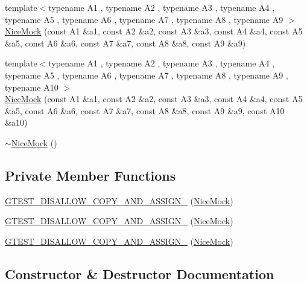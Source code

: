 \begin{DoxyCompactItemize}
\item 
{\footnotesize template$<$typename A1 , typename A2 , typename A3 , typename A4 , typename A5 , typename A6 , typename A7 , typename A8 , typename A9 $>$ }\\\mbox{\hyperlink{classtesting_1_1_nice_mock_a61cfc9282222928590bcdaf851a806c6}{Nice\+Mock}} (const A1 \&a1, const A2 \&a2, const A3 \&a3, const A4 \&a4, const A5 \&a5, const A6 \&a6, const A7 \&a7, const A8 \&a8, const A9 \&a9)
\item 
{\footnotesize template$<$typename A1 , typename A2 , typename A3 , typename A4 , typename A5 , typename A6 , typename A7 , typename A8 , typename A9 , typename A10 $>$ }\\\mbox{\hyperlink{classtesting_1_1_nice_mock_a4baf1da52f4c892fc02f6ba10c0b8c02}{Nice\+Mock}} (const A1 \&a1, const A2 \&a2, const A3 \&a3, const A4 \&a4, const A5 \&a5, const A6 \&a6, const A7 \&a7, const A8 \&a8, const A9 \&a9, const A10 \&a10)
\item 
\mbox{\hyperlink{classtesting_1_1_nice_mock_a30be5e5e20248f31c8390cd88fa74d7f}{$\sim$\+Nice\+Mock}} ()
\end{DoxyCompactItemize}
\subsection*{Private Member Functions}
\begin{DoxyCompactItemize}
\item 
\mbox{\hyperlink{classtesting_1_1_nice_mock_aee46eca734708818a8af94624eb512dd}{G\+T\+E\+S\+T\+\_\+\+D\+I\+S\+A\+L\+L\+O\+W\+\_\+\+C\+O\+P\+Y\+\_\+\+A\+N\+D\+\_\+\+A\+S\+S\+I\+G\+N\+\_\+}} (\mbox{\hyperlink{classtesting_1_1_nice_mock}{Nice\+Mock}})
\item 
\mbox{\hyperlink{classtesting_1_1_nice_mock_aee46eca734708818a8af94624eb512dd}{G\+T\+E\+S\+T\+\_\+\+D\+I\+S\+A\+L\+L\+O\+W\+\_\+\+C\+O\+P\+Y\+\_\+\+A\+N\+D\+\_\+\+A\+S\+S\+I\+G\+N\+\_\+}} (\mbox{\hyperlink{classtesting_1_1_nice_mock}{Nice\+Mock}})
\item 
\mbox{\hyperlink{classtesting_1_1_nice_mock_aee46eca734708818a8af94624eb512dd}{G\+T\+E\+S\+T\+\_\+\+D\+I\+S\+A\+L\+L\+O\+W\+\_\+\+C\+O\+P\+Y\+\_\+\+A\+N\+D\+\_\+\+A\+S\+S\+I\+G\+N\+\_\+}} (\mbox{\hyperlink{classtesting_1_1_nice_mock}{Nice\+Mock}})
\end{DoxyCompactItemize}


\subsection{Constructor \& Destructor Documentation}
\mbox{\label{classtesting_1_1_nice_mock_a10bbd6ebe779ac8ab1f9f3ae2dee9310}} 
